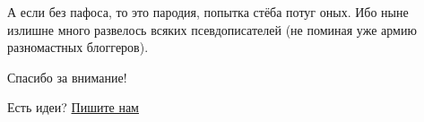\documentclass{ideas}
\begin{document}
 А если без пафоса, то это пародия, попытка стёба потуг оных. Ибо ныне излишне много развелось всяких псевдописателей (не поминая уже армию разномастных блоггеров).






\vspace*{\fill}
\begin{center}
    \large 
    Спасибо за внимание!

    \vspace{2em}
    Есть идеи?
    \href{mailto:anto-kha0@rambler.ru}{Пишите нам}
\end{center}
\vfill
\thispagestyle{empty}
\end{document}
